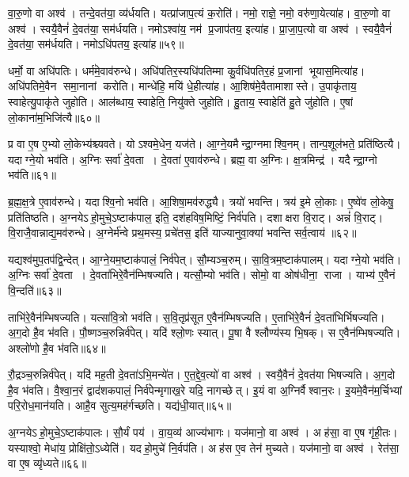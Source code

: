 वा॒रु॒णो वा अश्व॑।
तन्दे॒वत॑या॒ व्य॑र्धयति।
यत्प्रा॑जाप॒त्यं क॒रोति॑।
नमो॒ राज्ञे॒ नमो॒ वरु॑णा॒येत्या॑ह।
वा॒रु॒णो वा अश्व॑।
स्वयै॒वैनं॑ दे॒वत॑या॒ सम॑र्धयति।
नमोऽश्वा॑य॒ नम॑ प्र॒जाप॑तय॒ इत्या॑ह।
प्रा॒जा॒प॒त्यो वा अश्व॑।
स्वयै॒वैनं॑ दे॒वत॑या॒ सम॑र्धयति।
नमोऽधि॑पतय॒ इत्या॑ह॥५९॥

धर्मो॒ वा अधि॑पतिः।
धर्म॑मे॒वाव॑रुन्धे।
अधि॑पतिर॒स्यधि॑पतिम्मा कु॒र्वधि॑पतिर॒हं प्र॒जानां भूयास॒मित्या॑ह।
अधि॑पतिमे॒वैन समा॒नानां करोति।
मान्धे॑हि॒ मयि॑ धे॒हीत्या॑ह।
आ॒शिष॑मे॒वैतामाशास्ते।
उ॒पाकृ॑ताय॒ स्वाहेत्यु॒पाकृ॑ते जुहोति।
आल॑ब्धाय॒ स्वाहेति॒ नियु॑क्ते जुहोति।
हु॒ताय॒ स्वाहेति॑ हु॒ते जु॑होति।
ए॒षां लो॒काना॑म॒भिजि॑त्यै॥६०॥

प्र वा ए॒ष ए॒भ्यो लो॒केभ्य॑श्च्यवते।
योऽश्वमे॒धेन॒ यज॑ते।
आ॒ग्ने॒यमैन्द्रा॒ग्नमाश्वि॒नम्।
तान्प॒शूल॑भते॒ प्रति॑ष्ठित्यै।
यदाग्ने॒यो भव॑ति।
अ॒ग्निः सर्वा॑ दे॒वता।
दे॒वता॑ ए॒वाव॑रुन्धे।
ब्रह्म॒ वा अ॒ग्निः।
क्ष॒त्रमिन्द्र॑।
यदैन्द्रा॒ग्नो भव॑ति॥६१॥

ब्र॒ह्म॒क्ष॒त्रे ए॒वाव॑रुन्धे।
यदाश्वि॒नो भव॑ति।
आ॒शिषा॒मव॑रुद्ध्यै।
त्रयो॑ भवन्ति।
त्रय॑ इ॒मे लो॒काः।
ए॒ष्वे॑व लो॒केषु॒ प्रति॑तिष्ठति।
अ॒ग्नयेऽहो॒मुचे॒ऽष्टाक॑पाल॒ इति॒ दश॑हविष॒मिष्टिं॒ निर्व॑पति।
दशाक्षरा वि॒राट्।
अन्नं॑ वि॒राट्।
वि॒राजै॒वान्नाद्य॒मव॑रुन्धे।
अ॒ग्नेर्म॑न्वे प्रथ॒मस्य॒ प्रचे॑तस॒ इति॑ याज्यानुवा॒क्या॑ भवन्ति सर्व॒त्वाय॑ ॥६२॥\anuvakamend[अधि॑पतय॒ इत्या॑हा॒भि॑जित्या ऐन्द्रा॒ग्नो भव॑ति रुन्ध॒ एकं च]

यद्यश्व॑मुप॒तप॑द्वि॒न्देत्।
आ॒ग्ने॒यम॒ष्टाक॑पालं॒ निर्व॑पेत्।
सौ॒म्यञ्च॒रुम्।
सा॒वि॒त्रम॒ष्टाक॑पालम्।
यदाग्ने॒यो भव॑ति।
अ॒ग्निः सर्वा॑ दे॒वता।
दे॒वता॑भिरे॒वैन॑म्भिषज्यति।
यत्सौ॒म्यो भव॑ति।
सोमो॒ वा ओष॑धीना॒ राजा।
याभ्य॑ ए॒वैनं वि॒न्दति॑॥६३॥

ताभि॑रे॒वैन॑म्भिषज्यति।
यत्सा॑वि॒त्रो भव॑ति।
स॒वि॒तृप्र॑सूत ए॒वैन॑म्भिषज्यति।
ए॒ताभि॑रे॒वैनं॑ दे॒वता॑भिर्भिषज्यति।
अ॒ग॒दो है॒व भ॑वति।
पौ॒ष्णञ्च॒रुन्निर्व॑पेत्।
यदि॑ श्लो॒णः स्यात्।
पू॒षा वै श्लौण्य॑स्य भि॒षक्।
स ए॒वैन॑म्भिषज्यति।
अश्लो॑णो है॒व भ॑वति॥६४॥

रौ॒द्रञ्च॒रुन्निर्व॑पेत्।
यदि॑ मह॒ती दे॒वता॑ऽभि॒मन्ये॑त।
ए॒त॒द्दे॒व॒त्यो॑ वा अश्व॑।
स्वयै॒वैनं॑ दे॒वत॑या भिषज्यति।
अ॒ग॒दो है॒व भ॑वति।
वै॒श्वा॒न॒रं द्वाद॑शकपालं॒ निर्व॑पेन्मृगाख॒रे यदि॒ नागच्छेत्।
इ॒यं वा अ॒ग्निर्वैश्वान॒रः।
इ॒यमे॒वैन॑म॒र्चिभ्यां परि॒रोध॒मान॑यति।
आहै॒व सुत्य॒मह॑र्गच्छति।
यद्य॑धी॒यात्॥६५॥

अ॒ग्नयेऽहो॒मुचे॒ऽष्टाक॑पालः।
सौ॒र्यं पय॑।
वा॒य॒व्य॑ आज्य॑भागः।
यज॑मानो॒ वा अश्व॑।
अह॑सा॒ वा ए॒ष गृ॑ही॒तः।
यस्याश्वो॒ मेधा॑य॒ प्रोक्षि॑तो॒ऽध्येति॑।
यदहो॒मुचे॑ नि॒र्वप॑ति।
अह॑स ए॒व तेन॑ मुच्यते।
यज॑मानो॒ वा अश्व॑।
रेत॑सा॒ वा ए॒ष व्यृ॑ध्यते॥६६॥

